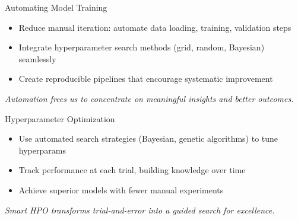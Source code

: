 \documentclass[aspectratio=169]{beamer}
\begin{document}
%
%
\begin{frame}{Automating Model Training}
\begin{itemize}
\item Reduce manual iteration: automate data loading, training, validation steps
\item Integrate hyperparameter search methods (grid, random, Bayesian) seamlessly
\item Create reproducible pipelines that encourage systematic improvement
\end{itemize}

\vspace{0.8em}
\emph{Automation frees us to concentrate on meaningful insights and better outcomes.}

\end{frame}

%
%
\begin{frame}{Hyperparameter Optimization}
\begin{itemize}
\item Use automated search strategies (Bayesian, genetic algorithms) to tune hyperparams
\item Track performance at each trial, building knowledge over time
\item Achieve superior models with fewer manual experiments
\end{itemize}

\vspace{0.8em}
\emph{Smart HPO transforms trial-and-error into a guided search for excellence.}

\end{frame}
\end{document}
